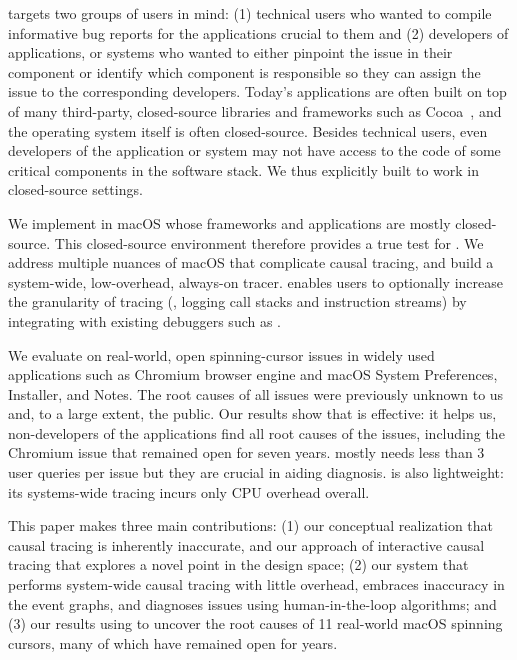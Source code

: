 \xxx targets two groups of users in mind: (1) technical users who wanted
to compile informative bug reports for the applications crucial to them
and (2) developers of applications, or systems who wanted to either
pinpoint the issue in their component or identify which component is
responsible so they can assign the issue to the corresponding developers.
Today's applications are often built on top of many third-party,
closed-source libraries and frameworks such as Cocoa~\cite{cocoa}, and the
operating system itself is often closed-source.  Besides technical users,
even developers of the application or system may not have access to the
code of some critical components in the software stack.  We thus
explicitly built \xxx to work in closed-source settings.

We implement \xxx in macOS whose frameworks and applications are mostly
closed-source. This closed-source environment therefore provides a true
test for \xxx. We address multiple nuances of macOS that complicate causal
tracing, and build a system-wide, low-overhead, always-on tracer. \xxx
enables users to optionally increase the granularity of tracing (\eg,
logging call stacks and instruction streams) by integrating with existing
debuggers such as .

We evaluate \xxx on \nbug real-world, open spinning-cursor issues in widely
used applications such as Chromium browser engine and macOS System Preferences,
Installer, and Notes. The root causes of all \nbug issues were previously
unknown to us and, to a large extent, the public. Our results show that \xxx is
effective: it helps us, non-developers of the applications find all root causes
of the issues, including the Chromium issue that remained open for seven years.
\xxx mostly needs less than 3 user queries per issue but they are crucial
in aiding diagnosis. \xxx is also lightweight: its systems-wide tracing incurs
only \cpuoverhead CPU overhead overall.


This paper makes three main contributions: (1) our conceptual realization
that causal tracing is inherently inaccurate, and our approach of
interactive causal tracing that explores a novel point in the design
space; (2) our system \xxx that performs system-wide causal tracing with
little overhead, embraces inaccuracy in the event graphs, and diagnoses
issues using human-in-the-loop algorithms; and (3) our results using \xxx
to uncover the root causes of 11 real-world macOS spinning cursors, many
of which have remained open for years.

